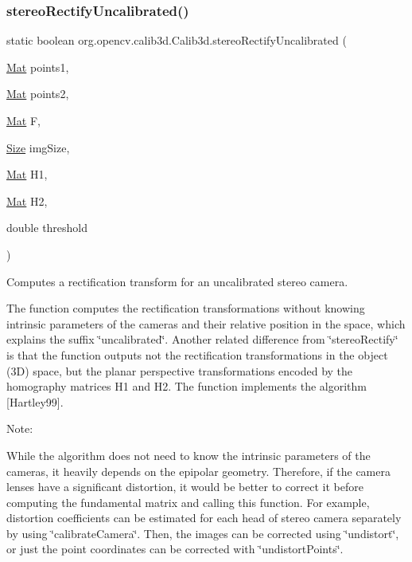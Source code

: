 \subsubsection{\texorpdfstring{stereo\+Rectify\+Uncalibrated()}{stereoRectifyUncalibrated()}\hspace{0.1cm}{\footnotesize\ttfamily [1/2]}}
{\footnotesize\ttfamily static boolean org.\+opencv.\+calib3d.\+Calib3d.\+stereo\+Rectify\+Uncalibrated (\begin{DoxyParamCaption}\item[{\mbox{\hyperlink{classorg_1_1opencv_1_1core_1_1_mat}{Mat}}}]{points1,  }\item[{\mbox{\hyperlink{classorg_1_1opencv_1_1core_1_1_mat}{Mat}}}]{points2,  }\item[{\mbox{\hyperlink{classorg_1_1opencv_1_1core_1_1_mat}{Mat}}}]{F,  }\item[{\mbox{\hyperlink{classorg_1_1opencv_1_1core_1_1_size}{Size}}}]{img\+Size,  }\item[{\mbox{\hyperlink{classorg_1_1opencv_1_1core_1_1_mat}{Mat}}}]{H1,  }\item[{\mbox{\hyperlink{classorg_1_1opencv_1_1core_1_1_mat}{Mat}}}]{H2,  }\item[{double}]{threshold }\end{DoxyParamCaption})\hspace{0.3cm}{\ttfamily [static]}}

Computes a rectification transform for an uncalibrated stereo camera.

The function computes the rectification transformations without knowing intrinsic parameters of the cameras and their relative position in the space, which explains the suffix \char`\"{}uncalibrated\char`\"{}. Another related difference from \char`\"{}stereo\+Rectify\char`\"{} is that the function outputs not the rectification transformations in the object (3D) space, but the planar perspective transformations encoded by the homography matrices {\ttfamily H1} and {\ttfamily H2}. The function implements the algorithm \mbox{[}Hartley99\mbox{]}.

Note\+:

While the algorithm does not need to know the intrinsic parameters of the cameras, it heavily depends on the epipolar geometry. Therefore, if the camera lenses have a significant distortion, it would be better to correct it before computing the fundamental matrix and calling this function. For example, distortion coefficients can be estimated for each head of stereo camera separately by using \char`\"{}calibrate\+Camera\char`\"{}. Then, the images can be corrected using \char`\"{}undistort\char`\"{}, or just the point coordinates can be corrected with \char`\"{}undistort\+Points\char`\"{}.


